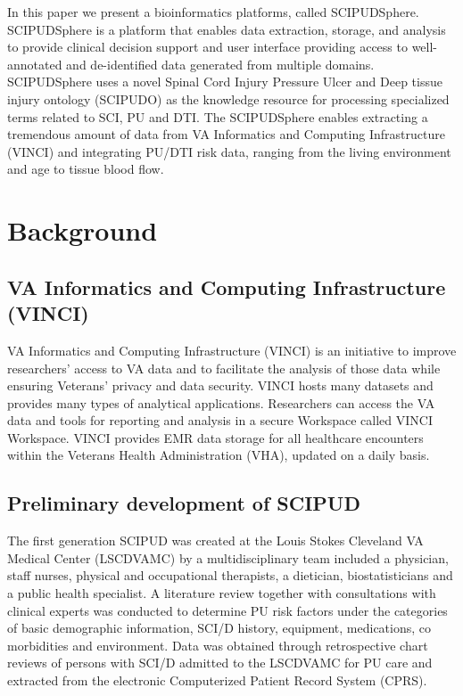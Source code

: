 \documentclass{amia}
\begin{document}
In this paper we present a bioinformatics platforms, called SCIPUDSphere. SCIPUDSphere is a platform that enables data extraction, storage, and analysis to provide clinical decision support and user interface providing access to well-annotated and de-identified data generated from multiple domains. SCIPUDSphere uses a novel Spinal Cord Injury Pressure Ulcer and Deep tissue injury ontology (SCIPUDO) as the knowledge resource for processing specialized terms related to SCI, PU and DTI. The SCIPUDSphere enables extracting a tremendous amount of data from VA Informatics and Computing Infrastructure (VINCI) \cite{VINCI} and integrating PU/DTI risk data, ranging from the living environment and age to tissue blood flow. 

\section{Background}

\subsection{VA Informatics and Computing Infrastructure (VINCI)}
VA Informatics and Computing Infrastructure (VINCI) is an initiative to improve researchers' access to VA data and to facilitate the analysis of those data while ensuring Veterans' privacy and data security. VINCI hosts many datasets and provides many types of analytical applications. Researchers can access the VA data and tools for reporting and analysis in a secure Workspace called VINCI Workspace. VINCI provides EMR data storage for all healthcare encounters within the Veterans Health Administration (VHA), updated on a daily basis. 

\subsection{Preliminary development of SCIPUD}
The first generation SCIPUD was created at the Louis Stokes Cleveland VA Medical Center (LSCDVAMC) by a multidisciplinary team included a physician, staff nurses, physical and occupational therapists, a dietician, biostatisticians and a public health specialist. A literature review \cite{literature_review} together with consultations with clinical experts was conducted to determine PU risk factors under the categories of basic demographic information, SCI/D history, equipment, medications, co morbidities and environment. Data was obtained through retrospective chart reviews of persons with SCI/D admitted to the LSCDVAMC for PU care and extracted from the electronic Computerized Patient Record System (CPRS).
\end{document}
